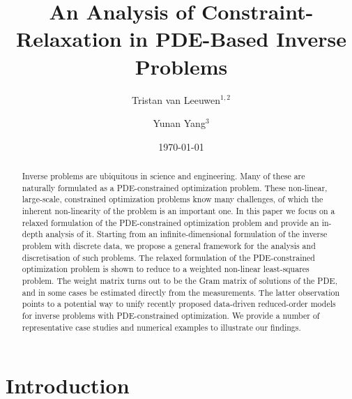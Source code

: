 \documentclass[12pt]{amsart}
\title{An Analysis of Constraint-Relaxation in PDE-Based Inverse Problems}
\author{Tristan van Leeuwen$^{1,2}$}
\author{Yunan Yang$^3$}
\date{\today}
\begin{document}
\maketitle

\begin{abstract}
Inverse problems are ubiquitous in science and engineering. Many of these are naturally formulated as a PDE-constrained optimization problem. These non-linear, large-scale, constrained optimization problems know many challenges, of which the inherent non-linearity of the problem is an important one. In this paper we focus on a relaxed formulation of the PDE-constrained optimization problem and provide an in-depth analysis of it. Starting from an infinite-dimensional formulation of the inverse problem with discrete data, we propose a general framework for the analysis and discretisation of such problems. The relaxed formulation of the PDE-constrained optimization problem is shown to reduce to a weighted non-linear least-squares problem. The weight matrix turns out to be the Gram matrix of solutions of the PDE, and in some cases be estimated directly from the measurements. The latter observation points to a potential way to unify recently proposed data-driven reduced-order models for inverse problems with PDE-constrained optimization. We provide a number of representative case studies and numerical examples to illustrate our findings.
\end{abstract}

\section{Introduction}

\end{document}
